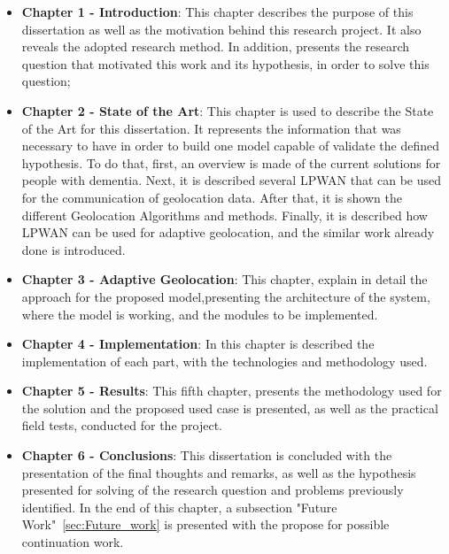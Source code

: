 \begin{itemize}
	\item \textbf{Chapter 1 - Introduction}: This chapter describes the purpose of this dissertation as well as the motivation behind this research project. It also reveals the adopted research method. In addition,  presents the research question that motivated this work and its hypothesis, in order to solve this question;
	
	
	\item \textbf{Chapter 2 - State of the Art}: This chapter is used to describe the State of the Art for this dissertation. It represents the information that was necessary to have in order to build one model capable of validate the defined hypothesis.
	To do that, first, an overview is made of the current solutions for people with dementia. Next, it is described several LPWAN that can be used for the communication of geolocation data. After that, it is shown the different Geolocation Algorithms and methods. 
	Finally, it is described how LPWAN can be used for adaptive geolocation, and the similar work already done is introduced. 
	
	
	\item \textbf{Chapter 3 - Adaptive Geolocation}: This chapter, explain in detail the approach for the  proposed model,presenting the architecture of the system, where the model is working, and the modules to be implemented. 
	
	
	\item \textbf{Chapter 4 - Implementation}:  In  this chapter is described  the implementation of each part, with the technologies and methodology used.
	
	
	\item \textbf{Chapter 5 - Results}: This fifth chapter, presents the methodology used for the solution and the  proposed used case is presented, as well as the practical field tests, conducted for the project. 
	
	\item \textbf{Chapter 6 - Conclusions}: This dissertation is concluded with the presentation of the final thoughts and remarks, as well as the hypothesis presented for solving of the research question and problems previously identified. In the end of this chapter, a subsection "Future Work"~\ref{sec:Future_work} is presented with the propose for possible continuation work. 

\end{itemize}



